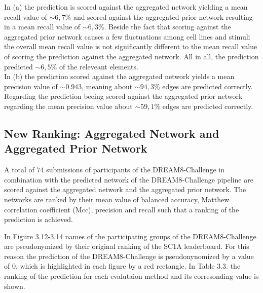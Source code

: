 In (a) the prediction is scored against the aggregated network yielding a mean recall value of $\sim 6,7\%$ and scored against the aggregated prior network resulting in a mean recall value of $\sim 6,3\%$. Beside the fact that scoring against the aggregated prior network causes a few fluctuations among cell lines and stimuli the overall mean recall value is not significantly different to the mean recall value of scoring the prediction against the aggregated network. All in all, the prediction predicted $\sim 6,5\%$ of the releveant elements.\\
In (b) the prediction scored against the aggregated network yields a mean precision value of $\sim 0.943$, meaning about $\sim 94,3\%$ edges are predicted correctly. Regarding the prediction beeing scored against the aggregated prior network regarding the mean precision value about $\sim 59,1\%$ edges are predicted correctly. 

\subsection*{New Ranking: Aggregated Network and Aggregated Prior Network}

A total of $74$ submissions of participants of the DREAM8-Challenge in combination with the predicted network of the DREAM8-Challenge pipeline are scored against the aggregated network and the aggregated prior network. The networks are ranked by their mean value of balanced accuracy, Matthew correlation coefficient (Mcc), precision and recall such that a ranking of the prediction is achieved. 

In Figure 3.12-3.14 names of the participating groups of the DREAM8-Challenge are pseudonymized by their original ranking of the SC1A leaderboard.
For this reason the prediction of the DREAM8-Challenge is pseudonynomized by a value of $0$, which is highlighted in each figure by a red rectangle. In Table 3.3. the ranking of the prediction for each evalutaion method and its corresonding value is shown.


